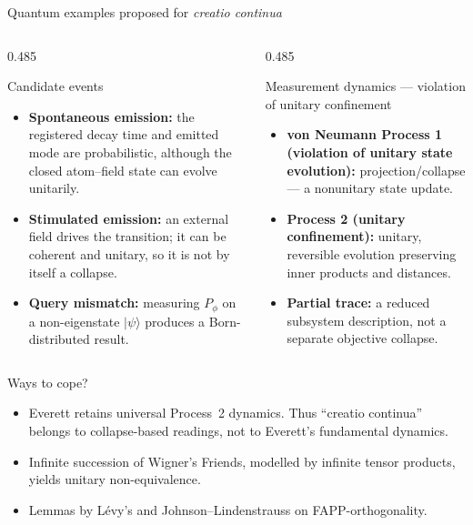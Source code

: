 \documentclass{beamer}
\begin{document}
\begin{frame}[shrink=3]{Quantum examples proposed for \emph{creatio continua}}
\footnotesize
\begin{columns}[T,onlytextwidth]
\begin{column}{0.485\textwidth}
\begin{block}{Candidate events}
\begin{itemize}
  \setlength{\itemsep}{0.5em}
  \item \textbf{Spontaneous emission:} the registered decay time and emitted
        mode are probabilistic, although the closed atom--field state can
        evolve unitarily.
  \item \textbf{Stimulated emission:} an external field drives the transition;
        it can be coherent and unitary, so it is not by itself a collapse.
  \item \textbf{Query mismatch:} measuring $P_\phi$ on a non-eigenstate
        $\lvert\psi\rangle$ produces a Born-distributed result.
\end{itemize}
\end{block}
\end{column}

\begin{column}{0.485\textwidth}
\begin{block}{Measurement dynamics --- violation of unitary confinement}
\begin{itemize}
  \setlength{\itemsep}{0.5em}
  \item \textbf{von Neumann Process 1 (violation of unitary state evolution):} projection/collapse --- a nonunitary
        state update.
  \item \textbf{Process 2 (unitary confinement):} unitary, reversible evolution preserving inner
        products and distances.
  \item \textbf{Partial trace:} a reduced subsystem description, not a
        separate objective collapse.
\end{itemize}
\end{block}
\end{column}
\end{columns}

\begin{alertblock}{Ways to cope?}
\begin{itemize}
  \setlength{\itemsep}{0.5em}
  \item
Everett retains universal Process~2 dynamics.
Thus \enquote{creatio continua} belongs to collapse-based readings, not to Everett's fundamental
dynamics.
\item
Infinite succession of Wigner's Friends, modelled by infinite tensor products, yields unitary non-equivalence.
\item Lemmas by L\'evy's and Johnson--Lindenstrauss on FAPP-orthogonality.
\end{itemize}
\end{alertblock}


\end{frame}
\end{document}
